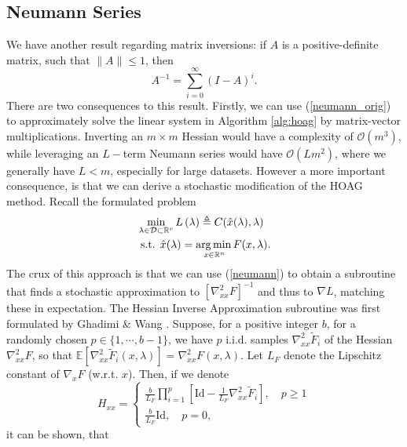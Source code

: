 \documentclass[11pt, twoside]{report}
\begin{document}
\subsection{Neumann Series}
\label{subsec: neumann}
We have another result regarding matrix inversions: if $A$ is a positive-definite matrix, such that $\|A\| \leq 1$, then
\begin{equation} \label{neumann_orig} 
    A^{-1} = \sum^{\infty}_{i=0} (I-A)^i.
\end{equation}
There are two consequences to this result. Firstly, we can use (\ref{neumann_orig}) to approximately solve the linear system in Algorithm \ref{alg:hoag} by matrix-vector multiplications. Inverting an $m \times m$ Hessian would have a complexity of $\mathcal{O}(m^3)$, while leveraging an $L-$term Neumann series would have $\mathcal{O}(Lm^2)$, where we generally have $L<m$, especially for large datasets. However a more important consequence, is that we can derive a stochastic modification of the HOAG method. Recall the formulated problem 
\begin{align} 
&\min _{\lambda \in \mathcal{D} \subset \mathbb{R}^r} L\left(\lambda \right) \triangleq C(\hat{x}(\lambda), \lambda) \label{outer_hoag_neu_orig}\\
&\text { s.t. } \hat{x}(\lambda) =\underset{x \in \mathbb{R}^{n}} {\operatorname*{arg\, min \,}} {F(x, \lambda)}. \label{inner_hoag_neu_orig}
\end{align}
The crux of this approach is that we can use (\ref{neumann}) to obtain a subroutine that finds a stochastic approximation to $[\nabla_{xx}^2 F]^{-1}$ and thus to $\nabla L$, matching these in expectation. The Hessian Inverse Approximation subroutine was first formulated by Ghadimi \& Wang \cite{ghadimi2018approximation}. Suppose, for a positive integer $b$, for a randomly chosen $p \in \{1,\cdots,b-1\}$, we have $p$ i.i.d. samples $\nabla^2_{xx} \tilde{F}_i$ of the Hessian  $\nabla^2_{xx} F$, so that $\mathbb{E}[\nabla^2_{xx} \tilde{F}_i(x,\lambda)] = \nabla^2_{xx} F(x,\lambda).$ Let $L_F$ denote the Lipschitz constant of $\nabla_x F$ (w.r.t. $x$). Then, if we denote
\begin{equation} \label{HIA}
    H_{xx} = \begin{cases}
        \frac{b}{L_F} \prod_{i=1}^p \left[\mathrm{Id} - \frac{1}{L_F}\nabla^2_{xx} \tilde{F}_i \right], \quad p \geq 1 \\
        \frac{b}{L_F} \mathrm{Id}, \quad p = 0,
    \end{cases}
\end{equation}
it can be shown, that
\end{document}
